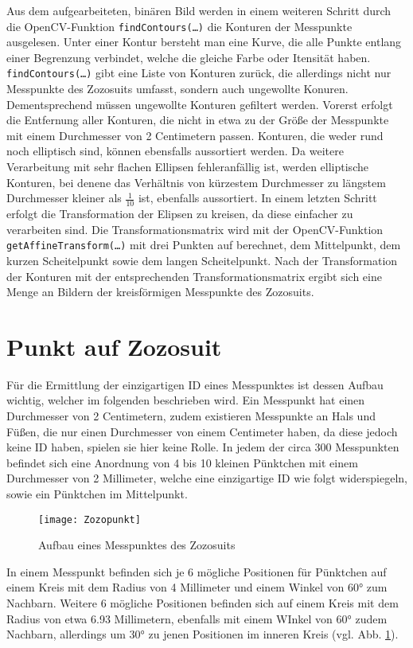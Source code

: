 Aus dem aufgearbeiteten, binären Bild werden in einem weiteren Schritt durch die OpenCV-Funktion \texttt{findContours(\dots)} die Konturen
der Messpunkte ausgelesen. Unter einer Kontur bersteht man eine Kurve, die alle Punkte entlang einer Begrenzung verbindet, welche die gleiche 
Farbe oder Itensität haben. \texttt{findContours(\dots)} gibt eine Liste von Konturen zurück, die allerdings nicht nur Messpunkte des Zozosuits
umfasst, sondern auch ungewollte Konuren. Dementsprechend müssen ungewollte Konturen gefiltert werden. Vorerst erfolgt die Entfernung
aller Konturen, die nicht in etwa zu der Größe der Messpunkte mit einem Durchmesser von 2 Centimetern passen. Konturen, die weder rund noch elliptisch sind,
können ebensfalls aussortiert werden. Da weitere Verarbeitung mit sehr flachen Ellipsen fehleranfällig ist, werden elliptische Konturen,
bei denene das Verhältnis von kürzestem Durchmesser zu längstem Durchmesser kleiner als $\frac{1}{10}$ ist, ebenfalls aussortiert. In einem
letzten Schritt erfolgt die Transformation der Elipsen zu kreisen, da diese einfacher zu verarbeiten sind. Die Transformationsmatrix wird
mit der OpenCV-Funktion \texttt{getAffineTransform(\dots)} mit drei Punkten auf berechnet, dem Mittelpunkt, dem kurzen Scheitelpunkt sowie dem langen
Scheitelpunkt. Nach der Transformation der Konturen mit der entsprechenden Transformationsmatrix ergibt sich eine Menge an Bildern der kreisförmigen Messpunkte 
des Zozosuits.

\section{Punkt auf Zozosuit}

Für die Ermittlung der einzigartigen ID eines Messpunktes ist dessen Aufbau wichtig, welcher im folgenden beschrieben wird.
Ein Messpunkt hat einen Durchmesser von 2 Centimetern, zudem existieren Messpunkte an Hals und Füßen, die nur einen Durchmesser
von einem Centimeter haben, da diese jedoch keine ID haben, spielen sie hier keine Rolle. In jedem der circa 300 Messpunkten befindet
sich eine Anordnung von 4 bis 10 kleinen Pünktchen mit einem Durchmesser von 2 Millimeter, welche eine einzigartige ID wie folgt widerspiegeln, sowie ein
Pünktchen im Mittelpunkt.
\begin{figure}[t]
    \centering
    \texttt{[image: Zozopunkt]}
    \label{fig:zozopunnkt}
    \caption{Aufbau eines Messpunktes des Zozosuits \cite{Pina:2018}}
\end{figure}
In einem Messpunkt befinden sich je 6 mögliche Positionen für Pünktchen auf einem Kreis mit dem Radius von 4 Millimeter und einem Winkel von 60° zum 
Nachbarn. Weitere 6 mögliche Positionen befinden sich auf einem Kreis mit dem Radius von etwa 6.93 Millimetern, ebenfalls mit einem WInkel von 60° zudem
Nachbarn, allerdings um 30° zu jenen Positionen im inneren Kreis (vgl. Abb. \ref{fig:zozopunnkt}).

